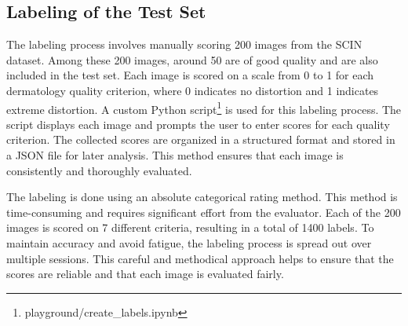 \subsection{Labeling of the Test Set}
\label{sub:LabelingTestSet}
The labeling process involves manually scoring 200 images from the SCIN \autocite{SCIN} dataset. Among these 200 images, around 50 are of good quality and are also included in the test set. Each image is scored on a scale from 0 to 1 for each dermatology quality criterion, where 0 indicates no distortion and 1 indicates extreme distortion. A custom Python script\footnote{playground/create\_labels.ipynb} is used for this labeling process. The script displays each image and prompts the user to enter scores for each quality criterion. The collected scores are organized in a structured format and stored in a JSON file for later analysis. This method ensures that each image is consistently and thoroughly evaluated. \par
\vspace{\baselineskip}
\noindent
The labeling is done using an absolute categorical rating method. This method is time-consuming and requires significant effort from the evaluator. Each of the 200 images is scored on 7 different criteria, resulting in a total of 1400 labels. To maintain accuracy and avoid fatigue, the labeling process is spread out over multiple sessions. This careful and methodical approach helps to ensure that the scores are reliable and that each image is evaluated fairly. \par
\vspace{\baselineskip}
\vspace{\baselineskip}
